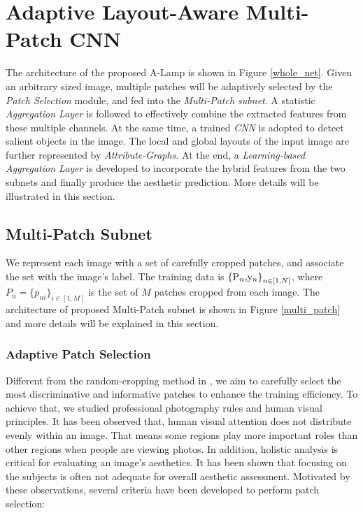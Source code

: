 \documentclass[10pt,twocolumn,letterpaper]{article}
\begin{document}
 
\section{Adaptive Layout-Aware Multi-Patch CNN}
The architecture of the proposed A-Lamp is shown in Figure \ref{whole_net}. Given an arbitrary sized image, multiple patches will be adaptively selected by the \textit{Patch Selection} module, and fed into the \textit{Multi-Patch subnet}. A statistic \textit{Aggregation Layer} is followed to effectively combine the extracted features from these multiple channels.
At the same time, a trained \textit{CNN} is adopted to detect salient objects in the image. The local and global layouts of the input image are further represented by \textit{Attribute-Graphs}. At the end, a \textit{Learning-based Aggregation Layer} is developed to incorporate the hybrid features from the two subnets and finally produce the aesthetic prediction. More details will be illustrated in this section. 

\subsection{Multi-Patch Subnet}
We represent each image with a set of carefully cropped patches, and associate the set with the image's label.
The training data is ${{\rm{\{ }}{{\rm{P}}_n}{\rm{, }}{{\rm{y}}_n}{\rm{\} }}_{n \in [1,N]}}$, where ${P_n} = {\{ {p_{ni}}\} _{i \in [1,M]}}$ is the set of $M$ patches cropped from each image. The architecture of proposed Multi-Patch subnet is shown in Figure \ref{multi_patch} and more details will be explained in this section. 

\subsubsection{Adaptive Patch Selection}
Different from the random-cropping method in \cite{Lu:2015:ICCV}, we aim to carefully select the most discriminative and informative patches to enhance the training efficiency. To achieve that, we studied professional photography rules and human visual principles. It has been observed that, human visual attention does not distribute evenly within an image. That means some regions play more important roles than other regions when people are viewing photos. In addition, holistic analysis is critical for evaluating an image's aesthetics. It has been shown that focusing on the subjects is often not adequate for overall aesthetic assessment. Motivated by these observations, several criteria have been developed to perform patch selection:
\end{document}
